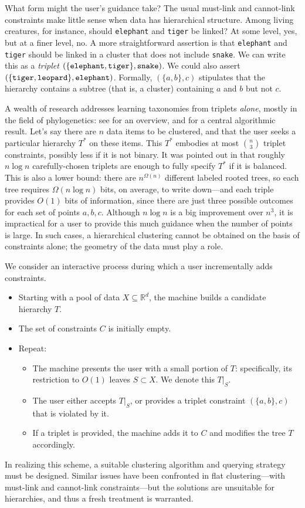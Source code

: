 What form might the user's guidance take? The usual must-link and cannot-link constraints make little sense when data has hierarchical structure. Among living creatures, for instance, should {\tt elephant} and {\tt tiger} be linked? At some level, yes, but at a finer level, no. A more straightforward assertion is that {\tt elephant} and {\tt tiger} should be linked in a cluster that does not include {\tt snake}. We can write this as a {\it triplet} $(\{\mbox{\tt elephant}, \mbox{\tt tiger}\}, \mbox{\tt snake})$. We could also assert $(\{\mbox{\tt tiger}, \mbox{\tt leopard}\}, \mbox{\tt elephant})$. Formally, $(\{a,b\},c)$ stipulates that the hierarchy contains a subtree (that is, a cluster) containing $a$ and $b$ but not $c$.

A wealth of research addresses learning taxonomies from triplets {\it alone}, mostly in the field of phylogenetics: see \cite{F04} for an overview, and \cite{ASSU81} for a central algorithmic result. Let's say there are $n$ data items to be clustered, and that the user seeks a particular hierarchy $T^*$ on these items. This $T^*$ embodies at most ${n \choose 3}$ triplet constraints, possibly less if it is not binary. It was pointed out in \cite{TLBSK11} that roughly $n \log n$ carefully-chosen triplets are enough to fully specify $T^*$ if it is balanced. This is also a lower bound: there are $n^{\Omega(n)}$ different labeled rooted trees, so each tree requires $\Omega(n \log n)$ bits, on average, to write down---and each triple provides $O(1)$ bits of information, since there are just three possible outcomes for each set of points $a,b,c$. Although $n \log n$ is a big improvement over $n^3$, it is impractical for a user to provide this much guidance when the number of points is large. In such cases, a hierarchical clustering cannot be obtained on the basis of constraints alone; the geometry of the data must play a role.

We consider an interactive process during which a user incrementally adds constraints.
\begin{itemize}
\item Starting with a pool of data $X \subseteq \mathbb{R}^d$, the machine builds a candidate hierarchy $T$.
\item The set of constraints $C$ is initially empty.
\item Repeat:
\begin{itemize}
\item The machine presents the user with a small portion of $T$: specifically, its restriction to $O(1)$ leaves $S \subset X$. We denote this $T |_S$.
\item The user either accepts $T|_S$, or provides a triplet constraint $(\{a,b\},c)$ that is violated by it.
\item If a triplet is provided, the machine adds it to $C$ and modifies the tree $T$ accordingly.
\end{itemize}
\end{itemize}
In realizing this scheme, a suitable clustering algorithm and querying strategy must be designed. Similar issues have been confronted in flat clustering---with must-link and cannot-link constraints---but the solutions are unsuitable for hierarchies, and thus a fresh treatment is warranted.

